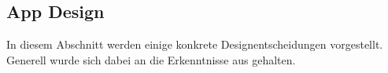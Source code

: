 \subsection{App Design}%
In diesem Abschnitt werden einige konkrete Designentscheidungen vorgestellt. Generell wurde sich dabei an die Erkenntnisse aus  gehalten.%
